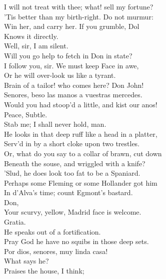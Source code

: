 \documentclass[a4paper,oneside]{memoir}
\begin{document}
\begin{drama*}
\subtlespeaks I will not treat with thee; what! sell my fortune?\\
'Tis better than my birth-right. Do not murmur:\\
Win her, and carry her. If you grumble, Dol\\
Knows it directly.\\
\facespeaks {} Well, sir, I am silent.\\
Will you go help to fetch in Don in state?\\
\subtlespeaks I follow you, sir. We must keep Face in awe,\\
Or he will over-look us like a tyrant.\\
Brain of a tailor! who comes here? Don John!\\
\surlyspeaks Senores, beso las manos a vuestras mercedes.\\
\subtlespeaks Would you had stoop'd a little, and kist our anos!\\
\facespeaks Peace, Subtle.\\
\subtlespeaks {} Stab me; I shall never hold, man.\\
He looks in that deep ruff like a head in a platter,\\
Serv'd in by a short cloke upon two trestles.\\
\facespeaks Or, what do you say to a collar of brawn, cut down\\
Beneath the souse, and wriggled with a knife?\\
\subtlespeaks 'Slud, he does look too fat to be a Spaniard.\\
\facespeaks Perhaps some Fleming or some Hollander got him\\
In d'Alva's time; count Egmont's bastard.\\
\subtlespeaks {} Don,\\
Your scurvy, yellow, Madrid face is welcome.\\
\surlyspeaks Gratia.\\
\subtlespeaks {} He speaks out of a fortification.\\
Pray God he have no squibs in those deep sets.\\
\surlyspeaks Por dios, senores, muy linda casa!\\
\subtlespeaks What says he?\\
\facespeaks {} Praises the house, I think;\\

\end{drama*}
\end{document}
